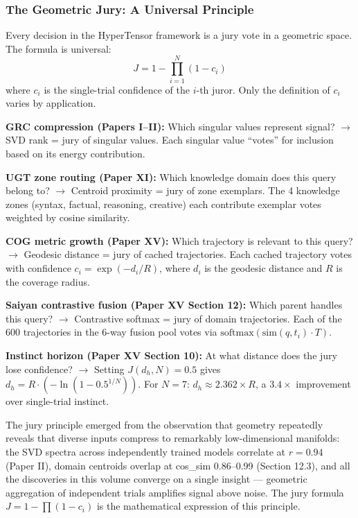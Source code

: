 \documentclass[11pt]{article}
\begin{document}
\subsubsection*{The Geometric Jury: A Universal Principle}

Every decision in the HyperTensor framework is a jury vote in a geometric space. The formula is universal:
$$J = 1 - \prod_{i=1}^N (1 - c_i)$$
where $c_i$ is the single-trial confidence of the $i$-th juror. Only the definition of $c_i$ varies by application.

\textbf{GRC compression (Papers I--II):} Which singular values represent signal? $\to$ SVD rank = jury of singular values. Each singular value ``votes'' for inclusion based on its energy contribution.

\textbf{UGT zone routing (Paper XI):} Which knowledge domain does this query belong to? $\to$ Centroid proximity = jury of zone exemplars. The 4 knowledge zones (syntax, factual, reasoning, creative) each contribute exemplar votes weighted by cosine similarity.

\textbf{COG metric growth (Paper XV):} Which trajectory is relevant to this query? $\to$ Geodesic distance = jury of cached trajectories. Each cached trajectory votes with confidence $c_i = \exp(-d_i/R)$, where $d_i$ is the geodesic distance and $R$ is the coverage radius.

\textbf{Saiyan contrastive fusion (Paper XV Section 12):} Which parent handles this query? $\to$ Contrastive softmax = jury of domain trajectories. Each of the 600 trajectories in the 6-way fusion pool votes via $\text{softmax}(\text{sim}(q, t_i) \cdot T)$.

\textbf{Instinct horizon (Paper XV Section 10):} At what distance does the jury lose confidence? $\to$ Setting $J(d_h, N) = 0.5$ gives $d_h = R \cdot (-\ln(1 - 0.5^{1/N}))$. For $N=7$: $d_h \approx 2.362 \times R$, a $3.4\times$ improvement over single-trial instinct.

The jury principle emerged from the observation that geometry repeatedly reveals that diverse inputs compress to remarkably low-dimensional manifolds: the SVD spectra across independently trained models correlate at $r = 0.94$ (Paper II), domain centroids overlap at cos\_sim 0.86--0.99 (Section 12.3), and all the discoveries in this volume converge on a single insight --- geometric aggregation of independent trials amplifies signal above noise. The jury formula $J = 1 - \prod(1 - c_i)$ is the mathematical expression of this principle.
\end{document}
